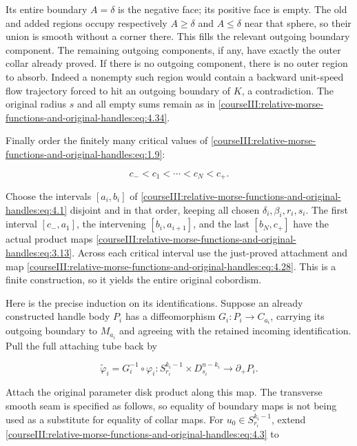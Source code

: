 Its entire boundary \(A=\delta\) is the negative face; its positive face is empty. The old and added regions occupy respectively \(A\geq\delta\) and \(A\leq\delta\) near that sphere, so their union is smooth without a corner there. This fills the relevant outgoing boundary component. The remaining outgoing components, if any, have exactly the outer collar already proved. If there is no outgoing component, there is no outer region to absorb. Indeed a nonempty such region would contain a backward unit-speed flow trajectory forced to hit an outgoing boundary of \(K\), a contradiction. The original radius \(s\) and all empty sums remain as in \eqref{courseIII:relative-morse-functions-and-original-handles:eq:4.34}.

Finally order the finitely many critical values of \eqref{courseIII:relative-morse-functions-and-original-handles:eq:1.9}:

\begin{equation}
c_-<c_1<\cdots<c_N<c_+.
\label{courseIII:relative-morse-functions-and-original-handles:eq:4.35}
\end{equation}

Choose the intervals \([a_i,b_i]\) of \eqref{courseIII:relative-morse-functions-and-original-handles:eq:4.1} disjoint and in that order, keeping all chosen \(\delta_i,\beta_i,r_i,s_i\). The first interval \([c_-,a_1]\), the intervening \([b_i,a_{i+1}]\), and the last \([b_N,c_+]\) have the actual product maps \eqref{courseIII:relative-morse-functions-and-original-handles:eq:3.13}. Across each critical interval use the just-proved attachment and map \eqref{courseIII:relative-morse-functions-and-original-handles:eq:4.28}. This is a finite construction, so it yields the entire original cobordism.

Here is the precise induction on its identifications. Suppose an already constructed handle body \(P_i\) has a diffeomorphism \(G_i:P_i\to C_{a_i}\), carrying its outgoing boundary to \(M_{a_i}\) and agreeing with the retained incoming identification. Pull the full attaching tube back by

\begin{equation}
\widetilde\varphi_i=G_i^{-1}\circ\varphi_i
:S_{r_i}^{k_i-1}\times D_{s_i}^{n-k_i}\longrightarrow\partial_+P_i.
\label{courseIII:relative-morse-functions-and-original-handles:eq:4.36}
\end{equation}

Attach the original parameter disk product along this map. The transverse smooth seam is specified as follows, so equality of boundary maps is not being used as a substitute for equality of collar maps. For \(u_0\in S_{r_i}^{k_i-1}\), extend \eqref{courseIII:relative-morse-functions-and-original-handles:eq:4.3} to

